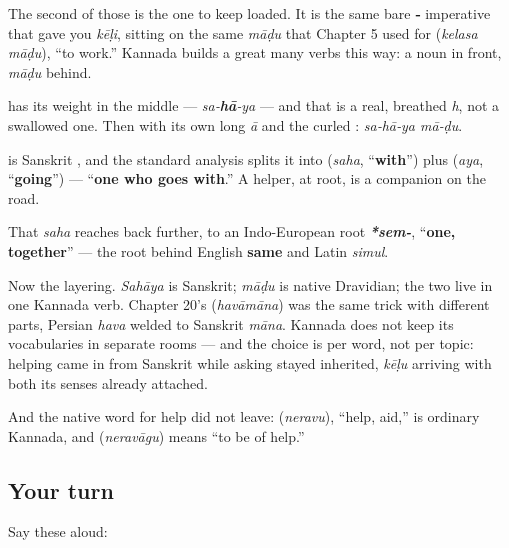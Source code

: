 The second of those is the one to keep loaded. It is the same bare \textbf{‑} imperative that gave you \emph{kēḷi}, sitting on the same \emph{māḍu} that Chapter 5 used for \textbf{ } (\emph{kelasa māḍu}), \textquotedblleft{}to work.\textquotedblright{} Kannada builds a great many verbs this way: a noun in front, \emph{māḍu} behind.

\begin{sounds}
\textbf{} has its weight in the middle — \emph{sa‑\textbf{hā}‑ya} — and that \textbf{} is a real, breathed \emph{h}, not a swallowed one. Then \textbf{} with its own long \emph{ā} and the curled \textbf{}: \emph{sa‑hā‑ya mā‑ḍu}.
\end{sounds}

\begin{cousinweb}
\textbf{} is Sanskrit \textbf{}, and the standard analysis splits it into \textbf{} (\emph{saha}, \textquotedblleft{}\textbf{with}\textquotedblright{}) plus \textbf{} (\emph{aya}, \textquotedblleft{}\textbf{going}\textquotedblright{}) — \textquotedblleft{}\textbf{one who goes with}.\textquotedblright{} A helper, at root, is a companion on the road.

That \emph{saha} reaches back further, to an Indo-European root \emph{\textbf{*sem-}}, \textquotedblleft{}\textbf{one, together}\textquotedblright{} — the root behind English \textbf{same} and Latin \emph{simul}.

Now the layering. \emph{Sahāya} is Sanskrit; \emph{māḍu} is native Dravidian; the two live in one Kannada verb. Chapter 20's \textbf{} (\emph{havāmāna}) was the same trick with different parts, Persian \emph{hava} welded to Sanskrit \emph{māna}. Kannada does not keep its vocabularies in separate rooms — and the choice is per word, not per topic: helping came in from Sanskrit while asking stayed inherited, \emph{kēḷu} arriving with both its senses already attached.

And the native word for help did not leave: \textbf{} (\emph{neravu}), \textquotedblleft{}help, aid,\textquotedblright{} is ordinary Kannada, and \textbf{} (\emph{neravāgu}) means \textquotedblleft{}to be of help.\textquotedblright{}
\end{cousinweb}

\subsection*{Your turn}
Say these aloud:

